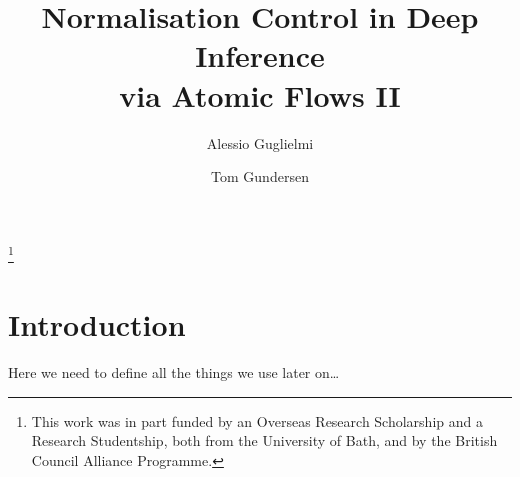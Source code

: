 \documentclass[a4paper]{amsart}
\newif\iflmcs\lmcsfalse %
\theoremstyle{remark}
\theoremstyle{definition}
\begin{document}
\title[Normalisation Control in Deep Inference   via Atomic Flows II]
      {Normalisation Control in Deep Inference\\ via Atomic Flows II}

\author{Alessio Guglielmi}
\address{University of Bath, Bath BA2 7AY, UK}

\author{Tom Gundersen}
\iflmcs\address{University of Bath, Bath BA2 7AY, UK}\fi

\thanks{This work was in part funded by an Overseas Research Scholarship and a Research Studentship, both from the University of Bath, and by the British Council Alliance Programme.}



\begin{abstract}
\end{abstract}

\maketitle

\section{Introduction}
\newcommand{\ot}{\mathbin\shortleftarrow}
\newcommand{\fff}{\mathsf f}
\newcommand{\ttt}{\mathsf t}
\newcommand{\ai}{\mathsf{ai}}
\newcommand{\aw}{\mathsf{aw}}
\newcommand{\ac}{\mathsf{ac}}
\newcommand{\aid}{{\ai{\downarrow}}}
\newcommand{\awd}{{\aw{\downarrow}}}
\newcommand{\acd}{{\ac{\downarrow}}}
\newcommand{\aiu}{{\ai{\uparrow}}}
\newcommand{\awu}{{\aw{\uparrow}}}
\newcommand{\acu}{{\ac{\uparrow}}}
\newcommand{\swi}{\mathsf{s}}
\newcommand{\med}{\mathsf{m}}
\newcommand{\sus}{\mathsf{ss}}
\newcommand{\said}{\mathsf{s}\aid}
\newcommand{\contr}{\mathsf{c}}
\newcommand{\cod}{{\contr{\downarrow}}}
\newcommand{\cou}{{\contr{\uparrow}}}
\newcommand{\SKS}{\mathsf{SKS}}
\newcommand{\ppl  }{{\mathchoice{\scriptstyle+}
                                {\scriptstyle+}
                                {\scriptstyle+}
                                {\scriptscriptstyle+}}}
\newcommand{\pmi  }{{\mathchoice{\scriptstyle-}
                                {\scriptstyle-}
                                {\scriptstyle-}
                                {\scriptscriptstyle-}}}
Here we need to define all the things we use later on\dots
\end{document}
